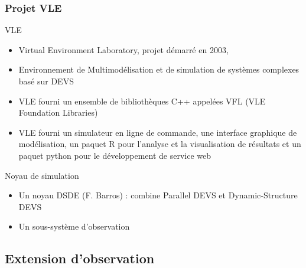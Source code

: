 \documentclass[xetex, compress, table, dvipsnames]{beamer}
\begin{document}
\begin{frame}
  \frametitle{Projet VLE}
  \begin{block}{VLE}
    \begin{itemize}
    \item \alert{Virtual Environment Laboratory}, projet démarré en
      2003,
    \item Environnement de Multimodélisation et de simulation de
      systèmes complexes basé sur DEVS
    \item VLE fourni un ensemble de bibliothèques C++ appelées VFL
      (\alert{VLE Foundation Libraries})
    \item VLE fourni un simulateur en ligne de commande, une interface
      graphique de modélisation, un paquet R pour l'analyse et la
      visualisation de résultats et un paquet python pour le
      développement de service web
    \end{itemize}
  \end{block}
  \pause
  \begin{alertblock}{Noyau de simulation}
    \begin{itemize}
    \item Un noyau DSDE (F. Barros) : combine \alert{Parallel DEVS} et
      \alert{Dynamic-Structure DEVS}
    \item Un sous-système d'observation
    \end{itemize}
  \end{alertblock}
\end{frame}

\subsection{Extension d'observation}
\end{document}
